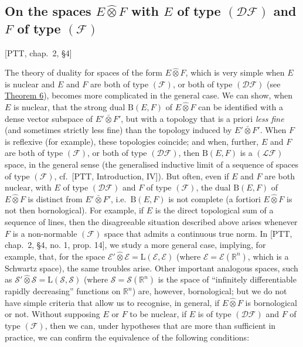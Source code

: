 \documentclass[british]{article}
\newcommand{\oldpage}[1]{\marginpar{\footnotesize$\Big\vert$ \textit{p.~#1}}}
\begin{document}
\subsection{\texorpdfstring{On the spaces \(E\hat{\otimes}F\) with \(E\)
of type \((\mathscr{DF})\) and \(F\) of type
\((\mathscr{F})\)}{On the spaces E\textbackslash hat\{\textbackslash otimes\}F with E of type (\textbackslash mathscr\{DF\}) and F of type (\textbackslash mathscr\{F\})}}\label{section-2-appendix}

{[}PTT, chap.~2, §4{]}

The theory of duality for spaces of the form \(E\hat{\otimes}F\), which
is very simple when \(E\) is nuclear and \(E\) and \(F\) are both of
type \((\mathscr{F})\), or both of type \((\mathscr{DF})\) (see
\hyperref[section-2-theorem-6]{Theorem 6}), becomes more complicated in
the general case. We can show, when \(E\) is nuclear, that the strong
dual \(\mathrm{B}(E,F)\) of \(E\hat{\otimes}F\) can be identified with a
dense vector subspace of \(E'\bar{\otimes}F'\), but with a topology that
is a priori \emph{less fine} (and sometimes strictly less fine) than the
topology induced by \(E'\bar{\otimes}F'\). When \(F\) is reflexive (for
example), these topologies coincide; and when, further, \(E\) and \(F\)
are both of type \((\mathscr{F})\), or both of type \((\mathscr{DF})\),
then \(\mathrm{B}(E,F)\) is a \((\mathscr{LF})\) space, in the general
sense (the generalised inductive limit of a sequence of spaces of type
\((\mathscr{F})\), cf.~{[}PTT, Introduction, IV{]}). But often, even if
\(E\) and \(F\) are both nuclear, with \(E\) of type \((\mathscr{DF})\)
and \(F\) of type \((\mathscr{F})\), the dual \(\mathrm{B}(E,F)\) of
\(E\hat{\otimes}F\) is distinct from \(E'\bar{\otimes}F'\),
i.e.~\(\mathrm{B}(E,F)\) is not complete (a fortiori \(E\hat{\otimes}F\)
is not then bornological). \oldpage{111} For example, if \(E\) is the
direct topological sum of a sequence of lines, then the disagreeable
situation described above arises whenever \(F\) is a non-normable
\((\mathscr{F})\) space that admits a continuous true norm. In {[}PTT,
chap.~2, §4, no. 1, prop. 14{]}, we study a more general case, implying,
for example, that, for the space
\(\mathscr{E}'\hat{\otimes}\mathscr{E}=\mathrm{L}(\mathscr{E},\mathscr{E})\)
(where \(\mathscr{E}=\mathscr{E}(\mathbb{R}^n)\), which is a Schwartz
space), the same troubles arise. Other important analogous spaces, such
as
\(\mathscr{S}'\hat{\otimes}\mathscr{S}=\mathrm{L}(\mathscr{S},\mathscr{S})\)
(where \(\mathscr{S}=\mathscr{S}(\mathbb{R}^n)\) is the space of
``infinitely differentiable rapidly decreasing'' functions on
\(\mathbb{R}^n\)) are, however, bornological; but we do not have simple
criteria that allow us to recognise, in general, if \(E\hat{\otimes}F\)
is bornological or not. Without supposing \(E\) or \(F\) to be nuclear,
if \(E\) is of type \((\mathscr{DF})\) and \(F\) of type
\((\mathscr{F})\), then we can, under hypotheses that are more than
sufficient in practice, we can confirm the equivalence of the following
conditions:
\end{document}
